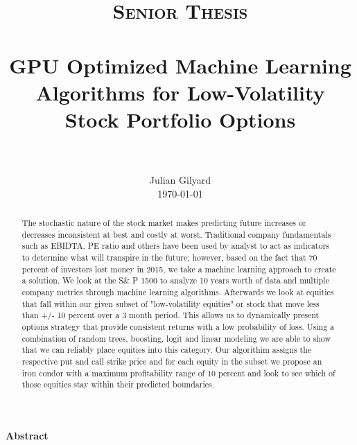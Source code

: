\documentclass[paper=letter, fontsize=11pt]{scrartcl}
\title{
		\usefont{OT1}{bch}{b}{n}
		\normalfont \normalsize \textsc{Senior Thesis} \\ [25pt]
		\horrule{0.5pt} \\[0.4cm]
		\huge GPU Optimized Machine Learning Algorithms for Low-Volatility Stock Portfolio Options \\
		\horrule{2pt} \\[0.5cm]
}
\author{
	\normalfont \normalsize
        Julian Gilyard\\[-3pt]		
	\normalsize
        \today
}
\date{}
\numberwithin{equation}{section}		%
\numberwithin{figure}{section}			%
\numberwithin{table}{section}				%
\begin{document}

\maketitle
\begin{center}
\textbf{Abstract}
\end{center}
\begin{abstract}
The stochastic nature of the stock market makes predicting future increases or decreases inconsistent at best and costly at worst. Traditional company fundamentals such as EBIDTA, PE ratio and others have been used by analyst to act as indicators to determine what will transpire in the future; however, based on the fact that 70 percent of investors lost money in 2015, we take a machine learning approach to create a solution. We look at the S\& P 1500 to analyze 10 years worth of data and multiple company metrics through machine learning algorithms. Afterwards we look at equities that fall within our given subset of "low-volatility equities" or stock that move less than +/- 10 percent over a 3 month period. This allows us to dynamically present options strategy that provide consistent returns with a low probability of loss. Using a combination of random trees, boosting, logit and linear modeling we are able to show that we can reliably place equities into this category.  Our algorithim assigns the respective put and call strike price and for each equity in the subset we propose an iron condor with a maximum profitability range of 10 percent and look to see which of those equities stay within their predicted boundaries.
\end{abstract}
\pagebreak
\tableofcontents
 
\end{document}
